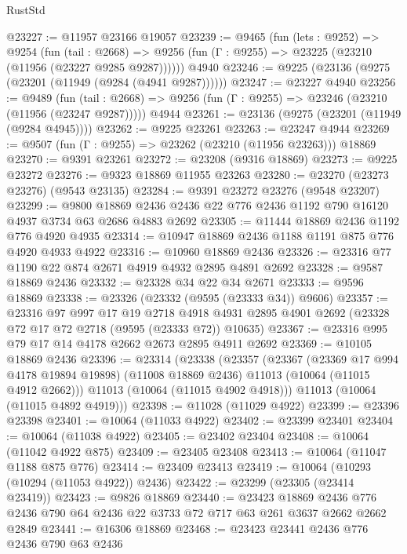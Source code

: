 \begin{lexlean}{RustStd}
\begin{coremodule}
@23227 := @11957 @23166 @19057
@23239 := @9465
    (fun (lets : @9252) =>
    @9254
      (fun (tail : @2668) =>
      @9256 (fun (Γ : @9255) => @23225 (@23210 (@11956 (@23227 @9285 @9287))))))
    @4940
@23246 := @9225 (@23136 (@9275 (@23201 (@11949 (@9284 (@4941 @9287))))))
@23247 := @23227 @4940
@23256 := @9489
    (fun (tail : @2668) => @9256 (fun (Γ : @9255) => @23246 (@23210 (@11956 (@23247 @9287)))))
    @4944
@23261 := @23136 (@9275 (@23201 (@11949 (@9284 @4945))))
@23262 := @9225 @23261
@23263 := @23247 @4944
@23269 := @9507 (fun (Γ : @9255) => @23262 (@23210 (@11956 @23263))) @18869
@23270 := @9391 @23261
@23272 := @23208 (@9316 @18869)
@23273 := @9225 @23272
@23276 := @9323 @18869 @11955 @23263
@23280 := @23270 (@23273 @23276) (@9543 @23135)
@23284 := @9391 @23272 @23276 (@9548 @23207)
@23299 := @9800
    @18869
    @2436
    @2436
    @22
    @776
    @2436
    @1192
    @790
    @16120
    @4937
    @3734
    @63
    @2686
    @4883
    @2692
@23305 := @11444 @18869 @2436 @1192 @776 @4920 @4935
@23314 := @10947 @18869 @2436 @1188 @1191 @875 @776 @4920 @4933 @4922
@23316 := @10960 @18869 @2436
@23326 := @23316 @77 @1190 @22 @874 @2671 @4919 @4932 @2895 @4891 @2692
@23328 := @9587 @18869 @2436
@23332 := @23328 @34 @22 @34 @2671
@23333 := @9596 @18869
@23338 := @23326 (@23332 (@9595 (@23333 @34)) @9606)
@23357 := @23316
    @97
    @997
    @17
    @19
    @2718
    @4918
    @4931
    @2895
    @4901
    @2692
    (@23328 @72 @17 @72 @2718 (@9595 (@23333 @72)) @10635)
@23367 := @23316 @995 @79 @17 @14 @4178 @2662 @2673 @2895 @4911 @2692
@23369 := @10105 @18869 @2436
@23396 := @23314
    (@23338
      (@23357
        (@23367
          (@23369 @17 @994 @4178 @19894 @19898)
          (@11008 @18869 @2436)
          @11013
          (@10064 (@11015 @4912 @2662)))
        @11013
        (@10064 (@11015 @4902 @4918)))
      @11013
      (@10064 (@11015 @4892 @4919)))
@23398 := @11028 (@11029 @4922)
@23399 := @23396 @23398
@23401 := @10064 (@11033 @4922)
@23402 := @23399 @23401
@23404 := @10064 (@11038 @4922)
@23405 := @23402 @23404
@23408 := @10064 (@11042 @4922 @875)
@23409 := @23405 @23408
@23413 := @10064 (@11047 @1188 @875 @776)
@23414 := @23409 @23413
@23419 := @10064 (@10293 (@10294 (@11053 @4922)) @2436)
@23422 := @23299 (@23305 (@23414 @23419))
@23423 := @9826 @18869
@23440 := @23423
    @18869
    @2436
    @776
    @2436
    @790
    @64
    @2436
    @22
    @3733
    @72
    @717
    @63
    @261
    @3637
    @2662
    @2662
    @2849
@23441 := @16306 @18869
@23468 := @23423
    @23441
    @2436
    @776
    @2436
    @790
    @63
    @2436

\end{coremodule}
\end{lexlean}
